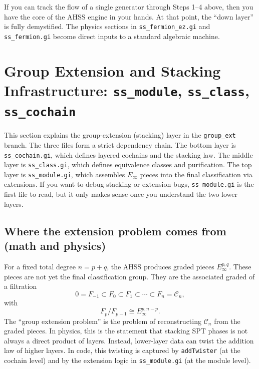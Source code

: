 \documentclass{SciPost}
\begin{document}
If you can track the flow of a single generator through Steps 1--4 above, then you have the core of the AHSS engine in your hands.
At that point, the ``down layer'' is fully demystified.
The physics sections in \texttt{ss\_fermion\_ez.gi} and \texttt{ss\_fermion.gi} become direct inputs to a standard algebraic machine.

\section{Group Extension and Stacking Infrastructure: \texttt{ss\_module}, \texttt{ss\_class}, \texttt{ss\_cochain}}
\label{sec:ss-extension-stacking}

This section explains the group-extension (stacking) layer in the \texttt{group\_ext} branch.
The three files form a strict dependency chain.
The bottom layer is \texttt{ss\_cochain.gi}, which defines layered cochains and the stacking law.
The middle layer is \texttt{ss\_class.gi}, which defines equivalence classes and purification.
The top layer is \texttt{ss\_module.gi}, which assembles $E_\infty$ pieces into the final classification via extensions.
If you want to debug stacking or extension bugs, \texttt{ss\_module.gi} is the first file to read, but it only makes sense once you understand the two lower layers.

\subsection{Where the extension problem comes from (math and physics)}

For a fixed total degree $n=p+q$, the AHSS produces graded pieces $E_\infty^{p,q}$.
These pieces are not yet the final classification group.
They are the associated graded of a filtration
\begin{equation}
0 = F_{-1} \subset F_0 \subset F_1 \subset \cdots \subset F_n = \mathcal{C}_n,
\end{equation}
with
\begin{equation}
F_p/F_{p-1} \cong E_\infty^{p,n-p}.
\end{equation}
The ``group extension problem'' is the problem of reconstructing $\mathcal{C}_n$ from the graded pieces.
In physics, this is the statement that stacking SPT phases is not always a direct product of layers.
Instead, lower-layer data can twist the addition law of higher layers.
In code, this twisting is captured by \texttt{addTwister} (at the cochain level) and by the extension logic in \texttt{ss\_module.gi} (at the module level).
\end{document}
